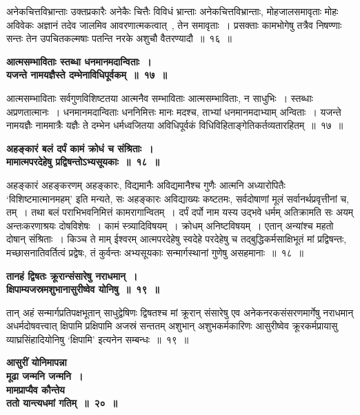 अनेकचित्तविभ्रान्ताः उक्तप्रकारैः अनेकैः चित्तैः विविधं भ्रान्ताः अनेकचित्तविभ्रान्ताः, मोहजालसमावृताः मोहः अविवेकः अज्ञानं तदेव जालमिव आवरणात्मकत्वात्~, तेन समावृताः~। प्रसक्ताः कामभोगेषु तत्रैव निषण्णाः सन्तः तेन उपचितकल्मषाः पतन्ति नरके अशुचौ वैतरण्यादौ~॥~१६~॥\par
 \begin{center}{\bfseries आत्मसम्भाविताः स्तब्धा धनमानमदान्विताः~।\\यजन्ते नामयज्ञैस्ते दम्भेनाविधिपूर्वकम्~॥~१७~॥}\end{center} 
आत्मसम्भाविताः सर्वगुणविशिष्टतया आत्मनैव सम्भाविताः आत्मसम्भाविताः, न साधुभिः~। स्तब्धाः अप्रणतात्मानः~। धनमानमदान्विताः धननिमित्तः मानः मदश्च, ताभ्यां धनमानमदाभ्याम् अन्विताः~। यजन्ते नामयज्ञैः नाममात्रैः यज्ञैः ते दम्भेन धर्मध्वजितया अविधिपूर्वकं विधिविहिताङ्गेतिकर्तव्यतारहितम्~॥~१७~॥\par
 \begin{center}{\bfseries अहङ्कारं बलं दर्पं कामं क्रोधं च संश्रिताः~।\\मामात्मपरदेहेषु प्रद्विषन्तोऽभ्यसूयकाः~॥~१८~॥}\end{center} 
अहङ्कारं अहङ्करणम् अहङ्कारः, विद्यमानैः अविद्यमानैश्च गुणैः आत्मनि अध्यारोपितैः ‘विशिष्टमात्मानमहम्’ इति मन्यते, सः अहङ्कारः अविद्याख्यः कष्टतमः, सर्वदोषाणां मूलं सर्वानर्थप्रवृत्तीनां च, तम्~। तथा बलं पराभिभवनिमित्तं कामरागान्वितम्~। दर्पं दर्पो नाम यस्य उद्भवे धर्मम् अतिक्रामति सः अयम् अन्तःकरणाश्रयः दोषविशेषः~। कामं स्त्र्यादिविषयम्~। क्रोधम् अनिष्टविषयम्~। एतान् अन्यांश्च महतो दोषान् संश्रिताः~। किञ्च ते माम् ईश्वरम् आत्मपरदेहेषु स्वदेहे परदेहेषु च तद्बुद्धिकर्मसाक्षिभूतं मां प्रद्विषन्तः, मच्छासनातिवर्तित्वं प्रद्वेषः, तं कुर्वन्तः अभ्यसूयकाः सन्मार्गस्थानां गुणेषु असहमानाः~॥~१८~॥\par
 \begin{center}{\bfseries तानहं द्विषतः क्रूरान्संसारेषु नराधमान्~।\\क्षिपाम्यजस्रमशुभानासुरीष्वेव योनिषु~॥~१९~॥}\end{center} 
तान् अहं सन्मार्गप्रतिपक्षभूतान् साधुद्वेषिणः द्विषतश्च मां क्रूरान् संसारेषु एव अनेकनरकसंसरणमार्गेषु नराधमान् अधर्मदोषवत्त्वात् क्षिपामि प्रक्षिपामि अजस्रं सन्ततम् अशुभान् अशुभकर्मकारिणः आसुरीष्वेव क्रूरकर्मप्रायासु व्याघ्रसिंहादियोनिषु ‘क्षिपामि’ इत्यनेन सम्बन्धः~॥~१९~॥\par
 \begin{center}{\bfseries आसुरीं योनिमापन्ना\\ मूढा जन्मनि जन्मनि~।\\मामप्राप्यैव कौन्तेय\\ ततो यान्त्यधमां गतिम्~॥~२०~॥}\end{center} 

